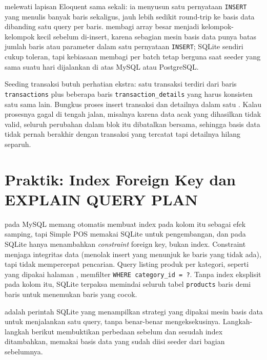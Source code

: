 melewati lapisan Eloquent sama sekali:
ia menyusun satu pernyataan \texttt{INSERT} yang menulis banyak baris
sekaligus, jauh lebih sedikit round-trip ke basis data dibanding satu
query per baris.  membagi array besar menjadi
kelompok-kelompok kecil sebelum di-insert, karena sebagian mesin basis
data punya batas jumlah baris atau parameter dalam satu pernyataan
\texttt{INSERT}; SQLite sendiri cukup toleran, tapi kebiasaan membagi
per batch tetap berguna saat seeder yang sama suatu hari dijalankan di
atas MySQL atau PostgreSQL.

\begin{warningbox}
Seeding transaksi butuh perhatian ekstra: satu transaksi terdiri dari
baris \texttt{transactions} plus beberapa baris
\texttt{transaction\_details} yang harus konsisten satu sama lain.
Bungkus proses insert transaksi dan detailnya dalam satu
. Kalau prosesnya
gagal di tengah jalan, misalnya karena data acak yang dihasilkan tidak
valid, seluruh perubahan dalam blok itu dibatalkan bersama, sehingga
basis data tidak pernah berakhir dengan transaksi yang tercatat tapi
detailnya hilang separuh.
\end{warningbox}

\section{Praktik: Index Foreign Key dan EXPLAIN QUERY PLAN}
\label{sec:desain-basis-data-3}

 pada MySQL memang otomatis membuat
index pada kolom itu sebagai efek samping, tapi Simple POS memakai
SQLite untuk pengembangan, dan pada SQLite  hanya
menambahkan \textit{constraint} foreign key, bukan index. Constraint
menjaga integritas data (menolak insert yang menunjuk ke baris yang
tidak ada), tapi tidak mempercepat pencarian. Query listing produk per
kategori, seperti yang dipakai halaman , memfilter
\texttt{WHERE category\_id = ?}. Tanpa index eksplisit pada kolom itu,
SQLite terpaksa memindai seluruh tabel \texttt{products} baris demi
baris untuk menemukan baris yang cocok.

 adalah perintah SQLite yang menampilkan
strategi yang dipakai mesin basis data untuk menjalankan satu query,
tanpa benar-benar mengeksekusinya. Langkah-langkah berikut membuktikan
perbedaan sebelum dan sesudah index ditambahkan, memakai basis data yang
sudah diisi seeder dari bagian sebelumnya.

